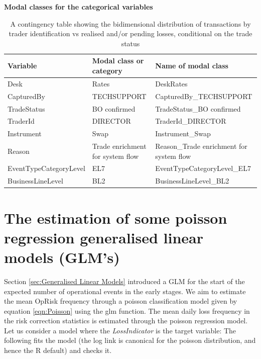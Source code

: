 \documentclass[]{article}
\begin{document}
\begin{table}[htbp]
        \centering
        \textbf{Modal classes for the categorical variables} 
\singlespacing        
        \small
        \setlength\tabcolsep{2pt}
            \begin{tabular}{|l|l|p{4cm}|} \hline
            Variable & Modal class or category & Name of modal class \\\hline
            Desk & Rates & DeskRates \\ \cline{1-3}
            CapturedBy & TECHSUPPORT & CapturedBy\_TECHSUPPORT \\ \cline{1-3}
            TradeStatus & BO confirmed & TradeStatus\_BO confirmed \\ \cline{1-3}
            TraderId & DIRECTOR & TraderId\_DIRECTOR \\ \cline{1-3}
            Instrument & Swap & Instrument\_Swap \\ \cline{1-3}
            Reason & Trade enrichment for system flow  & Reason\_Trade enrichment for system flow \\ \cline{1-3}
            EventTypeCategoryLevel & EL7 & EventTypeCategoryLevel\_EL7 \\ \cline{1-3}
            BusinessLineLevel & BL2 & BusinessLineLevel\_BL2 \\ \cline{1-3} 
            \end{tabular}
            \caption{A contingency table showing the bidimensional distribution of transactions by trader identification vs realised and/or pending losses, conditional on the trade status}
            \label{tab:Mosaic_Contingency}
\end{table}
\doublespacing

\section{The estimation of some poisson regression generalised linear models (GLM's)}
\label{sec:The estimation of some poisson regression generalised linear models (GLM's)}

Section \ref{sec:Generalised Linear Models} introduced a GLM for the
start of the expected number of operational events in the early stages.
We aim to estimate the mean OpRisk frequency through a poisson
classification model given by equation \ref{eqn:Poisson} using the glm
function. The mean daily loss frequency in the risk correction
statistics is estimated through the poisson regression model. Let us
consider a model where the \emph{LossIndicator} is the target variable:
The following fits the model (the log link is canonical for the poisson
distribution, and hence the R default) and checks it.\medskip
\end{document}
